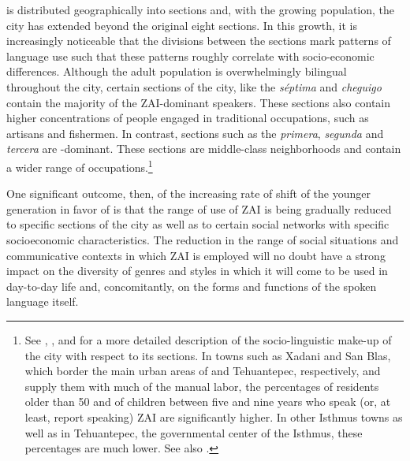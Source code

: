 is distributed geographically into sections and, with the growing population, the city has extended beyond the original eight sections. In this growth, it is increasingly noticeable that the divisions between the sections mark patterns of language use such that these patterns roughly correlate with socio-economic differences.  Although the adult population is overwhelmingly bilingual throughout the city, certain sections of the city, like the \textit{s\'{e}ptima} and \textit{cheguigo} contain the majority of the ZAI-dominant speakers. These sections also contain higher concentrations of people engaged in traditional occupations, such as artisans and fishermen. In contrast, sections such as the \textit{primera},  \textit{segunda} and  \textit{tercera} are -dominant. These sections are middle-class neighborhoods and contain a wider range of occupations.\footnote{See \citet{saynes2002}, \citet{augsburger2004}, and \citet[Chapter 1]{mccomsey2015} for a more detailed description of the socio-linguistic make-up of the city with respect to its sections. In towns such as Xadani and San Blas, which border the main urban areas of  and Tehuantepec, respectively, and supply them with much of the manual labor, the percentages of residents older than 50 and of children between five and nine years who speak (or, at least, report speaking) ZAI are significantly higher. In other Isthmus towns as well as in Tehuantepec, the governmental center of the Isthmus, these percentages are much lower. See also \citet{toledo2018}.} 

One significant outcome, then, of the increasing rate of shift of the younger generation in favor of  is that the range of use of ZAI is being gradually reduced to specific sections of the city as well as to certain social networks with specific socioeconomic characteristics. The reduction in the range of social situations and communicative contexts in which ZAI is employed will no doubt have a strong impact on the diversity of genres and styles in which it will come to be used in day-to-day life and, concomitantly, on the forms and functions of the spoken language itself.



